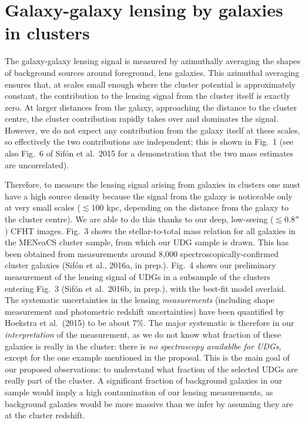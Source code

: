 \documentclass[12pt]{article}
\begin{document}
\section*{Galaxy-galaxy lensing by galaxies in clusters}

The galaxy-galaxy lensing signal is measured by azimuthally averaging the shapes of background sources around foreground, lens galaxies. This azimuthal averaging ensures that, at scales small enough where the cluster potential is approximately constant, the contribution to the lensing signal from the cluster itself is exactly zero. At larger distances from the galaxy, approaching the distance to the cluster centre, the cluster contribution rapidly takes over and dominates the signal. However, we do not expect any contribution from the galaxy itself at these scales, so effectively the two contributions are independent; this is shown in Fig.\ 1 (see also Fig.\ 6 of Sif\'on et al.\ 2015 for a demonstration that tbe two mass estimates are uncorrelated).

Therefore, to measure the lensing signal arising from galaxies in clusters one must have a high source density because the signal from the galaxy is noticeable only at very small scales ($\lesssim100$ kpc, depending on the distance from the galaxy to the cluster centre). We are able to do this thanks to our deep, low-seeing ($\lesssim0.8''$) CFHT images. Fig.\ 3 shows the stellar-to-total mass relation for all galaxies in the MENeaCS cluster sample, from which our UDG sample is drawn. This has been obtained from measurements around 8,000 spectroscopically-confirmed cluster galaxies (Sif\'on et al., 2016a, in prep.). Fig.\ 4 shows our preliminary measurement of the lensing signal of UDGs in a subsample of the clusters entering Fig.\ 3 (Sif\'on et al.\ 2016b, in prep.), with the best-fit model overlaid. The systematic uncertainties in the lensing \emph{measurements} (including shape measurement and photometric redshift uncertainties) have been quantified by Hoekstra et al.\ (2015) to be about 7\%. The major systematic is therefore in our \emph{interpretation} of the measurement, as we do not know what fraction of these galaxies is really in the cluster: there is \emph{no spectroscopy availablbe for UDGs}, except for the one example mentioned in the proposal. This is the main goal of our proposed observations: to understand what fraction of the selected UDGs are really part of the cluster. A significant fraction of background galaxies in our sample would imply a high contamination of our lensing measurements, as background galaxies would be more massive than we infer by assuming they are at the cluster redshift.
\end{document}
